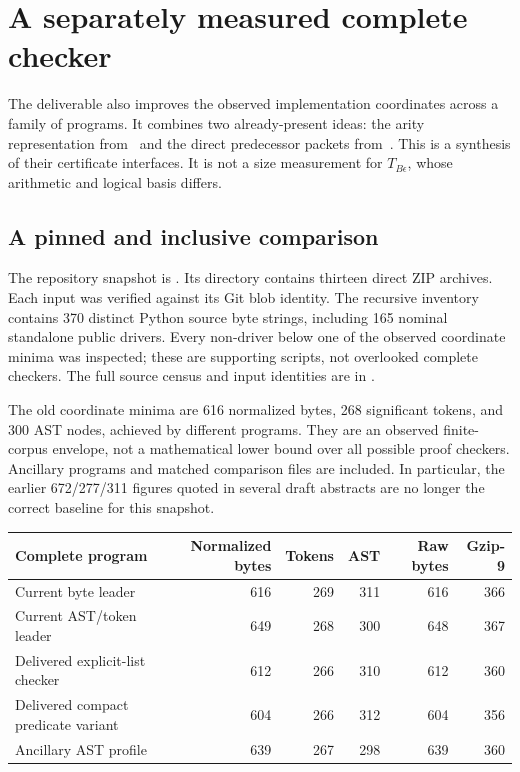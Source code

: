 \section{A separately measured complete checker}
\label{sec:checker}

The deliverable also improves the observed implementation coordinates across a family of programs. It combines two already-present ideas: the arity representation from~\cite{arity} and the direct predecessor packets from~\cite{uniform}. This is a synthesis of their certificate interfaces. It is not a size measurement for $T_{B\epsilon}$, whose arithmetic and logical basis differs.

\subsection{A pinned and inclusive comparison}
The repository snapshot is . Its directory contains thirteen direct ZIP archives. Each input was verified against its Git blob identity. The recursive inventory contains 370 distinct Python source byte strings, including 165 nominal standalone public drivers. Every non-driver below one of the observed coordinate minima was inspected; these are supporting scripts, not overlooked complete checkers. The full source census and input identities are in .

The old coordinate minima are 616 normalized bytes, 268 significant tokens, and 300 AST nodes, achieved by different programs. They are an observed finite-corpus envelope, not a mathematical lower bound over all possible proof checkers. Ancillary programs and matched comparison files are included. In particular, the earlier 672/277/311 figures quoted in several draft abstracts are no longer the correct baseline for this snapshot.

\begin{center}\small
\begin{tabular}{lrrrrr}
\toprule
Complete program & Normalized bytes & Tokens & AST & Raw bytes & Gzip-9\\\midrule
Current byte leader & 616 &269&311&616&366\\
Current AST/token leader &649&268&300&648&367\\
Delivered explicit-list checker &612&266&310&612&360\\
Delivered compact predicate variant &604&266&312&604&356\\
Ancillary AST profile &639&267&298&639&360\\
\bottomrule
\end{tabular}
\end{center}

